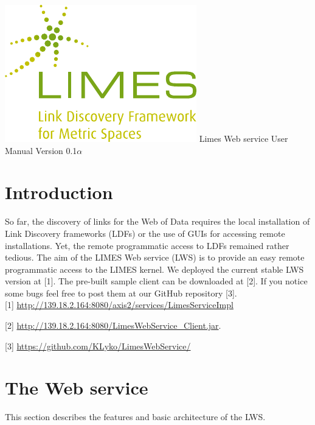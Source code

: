\documentclass{article}
\begin{document}
\begin{titlepage}
	\begin{center}
		\includegraphics[width=\textwidth]{images/limes_logo.pdf}
		\centering
		\huge Limes Web service User Manual
		\huge Version 0.1$\alpha$	
		\vfill
	\end{center}
\end{titlepage}
\tableofcontents
\newpage
\section{Introduction}
So far, the discovery of links for the Web of Data requires the local installation of Link Discovery frameworks (LDFs) or the use of GUIs for accessing remote installations. 
Yet, the remote programmatic access to LDFs remained rather tedious. 
The aim of the LIMES Web service (LWS) is to provide an easy remote programmatic access to the LIMES kernel.
We deployed the current stable LWS version at [1].
The pre-built sample client can be downloaded at [2]. 
If you notice some bugs feel free to post them at our GitHub repository [3]. 
\\

[1] \url{http://139.18.2.164:8080/axis2/services/LimesServiceImpl} 

[2] \url{http://139.18.2.164:8080/LimesWebService_Client.jar}.

[3] \url{https://github.com/KLyko/LimesWebService/}\\
\section{The Web service}
This section describes the features and basic architecture of the LWS.
\end{document}
